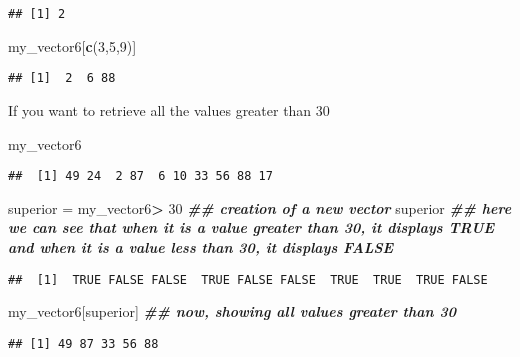\documentclass[
]{article}
\newenvironment{Shaded}{\begin{snugshade}}{\end{snugshade}}
\newcommand{\DecValTok}[1]{\textcolor[rgb]{0.00,0.00,0.81}{#1}}
\newcommand{\DocumentationTok}[1]{\textcolor[rgb]{0.56,0.35,0.01}{\textbf{\textit{#1}}}}
\newcommand{\FunctionTok}[1]{\textcolor[rgb]{0.13,0.29,0.53}{\textbf{#1}}}
\newcommand{\NormalTok}[1]{#1}
\newcommand{\OtherTok}[1]{\textcolor[rgb]{0.56,0.35,0.01}{#1}}
\newcommand{\SpecialCharTok}[1]{\textcolor[rgb]{0.81,0.36,0.00}{\textbf{#1}}}
\begin{document}
\begin{verbatim}
## [1] 2
\end{verbatim}

\begin{Shaded}
\begin{Highlighting}[]
\NormalTok{my\_vector6[}\FunctionTok{c}\NormalTok{(}\DecValTok{3}\NormalTok{,}\DecValTok{5}\NormalTok{,}\DecValTok{9}\NormalTok{)]}
\end{Highlighting}
\end{Shaded}

\begin{verbatim}
## [1]  2  6 88
\end{verbatim}

If you want to retrieve all the values greater than 30

\begin{Shaded}
\begin{Highlighting}[]
\NormalTok{my\_vector6}
\end{Highlighting}
\end{Shaded}

\begin{verbatim}
##  [1] 49 24  2 87  6 10 33 56 88 17
\end{verbatim}

\begin{Shaded}
\begin{Highlighting}[]
\NormalTok{superior }\OtherTok{=}\NormalTok{ my\_vector6}\SpecialCharTok{\textgreater{}} \DecValTok{30} \DocumentationTok{\#\# creation of a new vector}
\NormalTok{superior }\DocumentationTok{\#\# here we can see that when it is a value greater than 30, it displays TRUE and when it is a value less than 30, it displays FALSE}
\end{Highlighting}
\end{Shaded}

\begin{verbatim}
##  [1]  TRUE FALSE FALSE  TRUE FALSE FALSE  TRUE  TRUE  TRUE FALSE
\end{verbatim}

\begin{Shaded}
\begin{Highlighting}[]
\NormalTok{my\_vector6[superior] }\DocumentationTok{\#\# now, showing all values greater than 30}
\end{Highlighting}
\end{Shaded}

\begin{verbatim}
## [1] 49 87 33 56 88
\end{verbatim}
\end{document}
